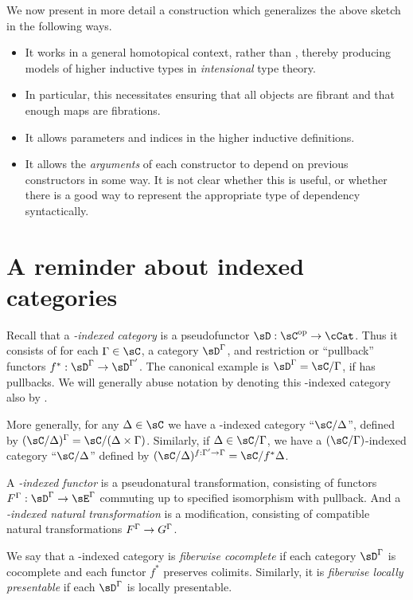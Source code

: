 \documentclass{amsart}
\begin{document}
We now present in more detail a construction which generalizes the above sketch in the following ways.
\begin{itemize}
\item It works in a general homotopical context, rather than \bSet, thereby producing models of higher inductive types in \emph{intensional} type theory.
\item In particular, this necessitates ensuring that all objects are fibrant and that enough maps are fibrations.
\item It allows parameters and indices in the higher inductive definitions.
\item It allows the \emph{arguments} of each constructor to depend on previous constructors in some way.
  It is not clear whether this is useful, or whether there is a good way to represent the appropriate type of dependency syntactically.
\end{itemize}


\section{A reminder about indexed categories}
\label{sec:indexed}

Recall that a \emph{\sC-indexed category} is a pseudofunctor $\sD:\sC\op\to\cCat$.
Thus it consists of for each $\Gamma\in\sC$, a category $\sD^\Gamma$, and restriction or ``pullback'' functors $f^*:\sD^{\Gm}\to\sD^{\Gm'}$.
The canonical example is $\sD^\Gm = \sC/\Gm$, if \sC has pullbacks.
We will generally abuse notation by denoting this \sC-indexed category also by \sC.

More generally, for any $\Delta\in\sC$ we have a \sC-indexed category ``$\sC/\Delta$'', defined by $(\sC/\Delta)^\Gm = \sC/(\Delta\times\Gm)$.
Similarly, if $\Delta \in\sC/\Gamma$, we have a $(\sC/\Gamma)$-indexed category ``$\sC/\Delta$'' defined by $(\sC/\Delta)^{f:\Gm'\to\Gm} = \sC/f^*\Delta$.

A \emph{\sC-indexed functor} is a pseudonatural transformation, consisting of functors $F^\Gm:\sD^\Gm \to \sE^\Gm$ commuting up to specified isomorphism with pullback.
And a \emph{\sC-indexed natural transformation} is a modification, consisting of compatible natural transformations $F^\Gamma \to G^\Gamma$.

We say that a \sC-indexed category \sD is \emph{fiberwise cocomplete} if each category $\sD^\Gm$ is cocomplete and each functor $f^*$ preserves colimits.
Similarly, it is \emph{fiberwise locally presentable} if each $\sD^\Gm$ is locally presentable.
\end{document}
